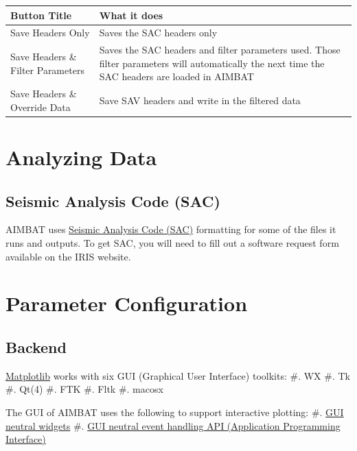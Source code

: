 \documentclass[letterpaper,10pt,english]{sphinxmanual}
\begin{document}
\begin{tabulary}{\linewidth}{|L|L|}
\hline
\textsf{\relax 
Button Title
} & \textsf{\relax 
What it does
}\\
\hline
Save Headers Only
 & 
Saves the SAC headers only
\\

Save Headers \& Filter Parameters
 & 
Saves the SAC headers and filter parameters used.
Those filter parameters will automatically the
next time the SAC headers are loaded in AIMBAT
\\

Save Headers \& Override Data
 & 
Save SAV headers and write in the filtered data
\\
\hline\end{tabulary}



\chapter{Analyzing Data}
\label{docfiles/analyzingData:analyzing-data}\label{docfiles/analyzingData::doc}

\section{Seismic Analysis Code (SAC)}
\label{docfiles/analyzingData:seismic-analysis-code-sac}
AIMBAT uses \href{http://www.iris.edu/files/sac-manual/}{Seismic Analysis Code (SAC)} formatting for some of the files it runs and outputs. To get SAC, you will need to fill out a software request form available on the IRIS website.


\chapter{Parameter Configuration}
\label{docfiles/parameterConfiguration:parameter-configuration}\label{docfiles/parameterConfiguration::doc}

\section{Backend}
\label{docfiles/parameterConfiguration:backend}
\href{http://matplotlib.org/contents.html}{Matplotlib} works with six GUI (Graphical User Interface) toolkits:
\#. WX
\#. Tk
\#. Qt(4)
\#. FTK
\#. Fltk
\#. macosx

The GUI of AIMBAT uses the following to support interactive plotting:
\#. \href{http://matplotlib.org/api/widgets\_api.html}{GUI neutral widgets}
\#. \href{http://matplotlib.org/users/event\_handling.html}{GUI neutral event handling API (Application Programming Interface)}
\end{document}
